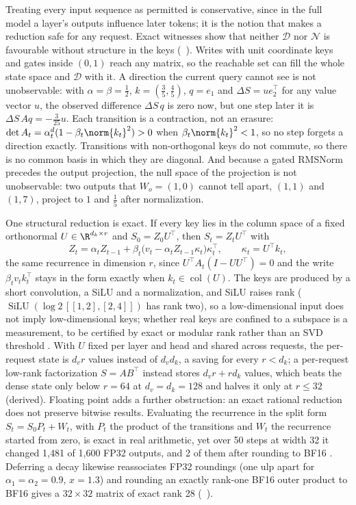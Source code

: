 Treating every input sequence as permitted is conservative, since in the full model a layer's outputs influence later tokens; it is the notion that makes a reduction safe for any request. Exact witnesses show that neither $\mathcal D$ nor $\mathcal N$ is favourable without structure in the keys (~). Writes with unit coordinate keys and gates inside $(0,1)$ reach any matrix, so the reachable set can fill the whole state space and $\mathcal D$ with it. A direction the current query cannot see is not unobservable: with $\alpha=\beta=\tfrac12$, $k=(\tfrac35,\tfrac45)$, $q=e_1$ and $\Delta S=ue_2^\top$ for any value vector $u$, the observed difference $\Delta S\,q$ is zero now, but one step later it is $\Delta S\,Aq=-\tfrac{3}{25}u$. Each transition is a contraction, not an erasure: $\det A_t=\alpha_t^d(1-\beta_t\norm{k_t}^2)>0$ when $\beta_t\norm{k_t}^2<1$, so no step forgets a direction exactly. Transitions with non-orthogonal keys do not commute, so there is no common basis in which they are diagonal. And because a gated RMSNorm precedes the output projection, the null space of the projection is not unobservable: two outputs that $W_o=(1,0)$ cannot tell apart, $(1,1)$ and $(1,7)$, project to $1$ and $\tfrac15$ after normalization.

One structural reduction is exact. If every key lies in the column space of a fixed orthonormal $U\in\R^{d_k\times r}$ and $S_0=Z_0U^\top$, then $S_t=Z_tU^\top$ with
\[Z_t=\alpha_tZ_{t-1}+\beta_t\bigl(v_t-\alpha_tZ_{t-1}\kappa_t\bigr)\kappa_t^\top,\qquad\kappa_t=U^\top k_t,\]
the same recurrence in dimension $r$, since $U^\top A_t(I-UU^\top)=0$ and the write $\beta_tv_tk_t^\top$ stays in the form exactly when $k_t\in\operatorname{col}(U)$. The keys are produced by a short convolution, a SiLU and a normalization, and SiLU raises rank ($\operatorname{SiLU}(\log2\,[[1,2],[2,4]])$ has rank two), so a low-dimensional input does not imply low-dimensional keys; whether real keys are confined to a subspace is a measurement, to be certified by exact or modular rank rather than an SVD threshold . With $U$ fixed per layer and head and shared across requests, the per-request state is $d_vr$ values instead of $d_vd_k$, a saving for every $r<d_k$; a per-request low-rank factorization $S=AB^\top$ instead stores $d_vr+rd_k$ values, which beats the dense state only below $r=64$ at $d_v=d_k=128$ and halves it only at $r\le32$ (derived). Floating point adds a further obstruction: an exact rational reduction does not preserve bitwise results. Evaluating the recurrence in the split form $S_t=S_0P_t+W_t$, with $P_t$ the product of the transitions and $W_t$ the recurrence started from zero, is exact in real arithmetic, yet over 50 steps at width 32 it changed 1,481 of 1,600 FP32 outputs, and 2 of them after rounding to BF16 . Deferring a decay likewise reassociates FP32 roundings (one ulp apart for $\alpha_1=\alpha_2=0.9$, $x=1.3$) and rounding an exactly rank-one BF16 outer product to BF16 gives a $32\times32$ matrix of exact rank 28 (~).

